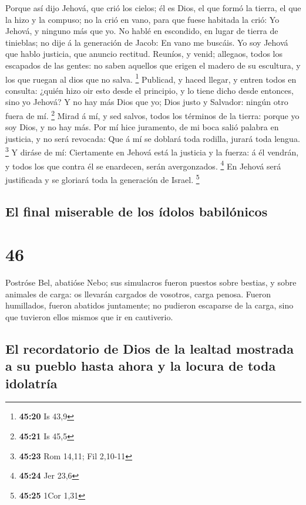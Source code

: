  Porque así dijo Jehová, que crió los cielos; él es Dios,
el que formó la tierra, el que la hizo y la compuso; no la crió en vano,
para que fuese habitada la crió: Yo Jehová, y ninguno más que yo.
 No hablé en escondido, en lugar de tierra de tinieblas; no
dije á la generación de Jacob: En vano me buscáis. Yo soy Jehová que
hablo justicia, que anuncio rectitud.  Reuníos, y venid;
allegaos, todos los escapados de las gentes: no saben aquellos que
erigen el madero de su escultura, y los que ruegan al dios que no salva.
\footnote{\textbf{45:20} Is 43,9}  Publicad, y haced
llegar, y entren todos en consulta: ¿quién hizo oir esto desde el
principio, y lo tiene dicho desde entonces, sino yo Jehová? Y no hay más
Dios que yo; Dios justo y Salvador: ningún otro fuera de mí. \footnote{\textbf{45:21}
  Is 45,5}  Mirad á mí, y sed salvos, todos los términos de
la tierra: porque yo soy Dios, y no hay más.  Por mí hice
juramento, de mi boca salió palabra en justicia, y no será revocada: Que
á mí se doblará toda rodilla, jurará toda lengua. \footnote{\textbf{45:23}
  Rom 14,11; Fil 2,10-11}  Y diráse de mí: Ciertamente en
Jehová está la justicia y la fuerza: á él vendrán, y todos los que
contra él se enardecen, serán avergonzados. \footnote{\textbf{45:24} Jer
  23,6}  En Jehová será justificada y se gloriará toda la
generación de Israel. \footnote{\textbf{45:25} 1Cor 1,31}

\hypertarget{el-final-miserable-de-los-uxeddolos-babiluxf3nicos}{%
\subsection{El final miserable de los ídolos
babilónicos}\label{el-final-miserable-de-los-uxeddolos-babiluxf3nicos}}

\hypertarget{section-45}{%
\section{46}\label{section-45}}

 Postróse Bel, abatióse Nebo; sus simulacros fueron puestos
sobre bestias, y sobre animales de carga: os llevarán cargados de
vosotros, carga penosa.  Fueron humillados, fueron abatidos
juntamente; no pudieron escaparse de la carga, sino que tuvieron ellos
mismos que ir en cautiverio.

\hypertarget{el-recordatorio-de-dios-de-la-lealtad-mostrada-a-su-pueblo-hasta-ahora-y-la-locura-de-toda-idolatruxeda}{%
\subsection{El recordatorio de Dios de la lealtad mostrada a su pueblo
hasta ahora y la locura de toda
idolatría}\label{el-recordatorio-de-dios-de-la-lealtad-mostrada-a-su-pueblo-hasta-ahora-y-la-locura-de-toda-idolatruxeda}}

